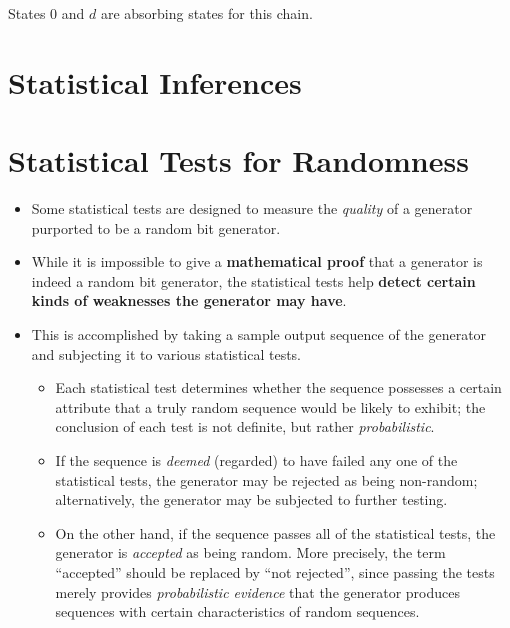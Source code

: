 \documentclass[12pt,openany]{book}
\theoremstyle{definition}
\begin{document}
	
	States 0 and \( d \) are absorbing states for this chain.
	
	\newpage
	\chapter{Statistical Inferences}
	
	\newpage
	\chapter{Statistical Tests for Randomness}
	
	\begin{itemize}
		\item Some statistical tests are designed to measure the \textit{quality} of a generator purported to be a random bit generator.
		\item While it is impossible to give a \textbf{mathematical proof} that a generator is indeed a random bit generator, the statistical tests help \textbf{detect certain kinds of weaknesses the generator may have}.
		\item This is accomplished by taking a sample output sequence of the generator and subjecting it to various statistical tests.
		\begin{itemize}
			\item Each statistical test determines whether the sequence possesses a certain attribute that a truly random sequence would be likely to exhibit; the conclusion of each test is not definite, but rather \textit{probabilistic}.
			\item If the sequence is \textit{deemed} (regarded) to have failed any one of the statistical tests, the generator may be rejected as being non-random; alternatively, the generator may be subjected to further testing.
			\item On the other hand, if the sequence passes all of the statistical tests, the generator is \textit{accepted} as being random. More precisely, the term ``accepted'' should be replaced by ``not rejected'', since passing the tests merely provides \textit{probabilistic evidence} that the generator produces sequences with certain characteristics of random sequences.
		\end{itemize}
	\end{itemize}
\end{document}
